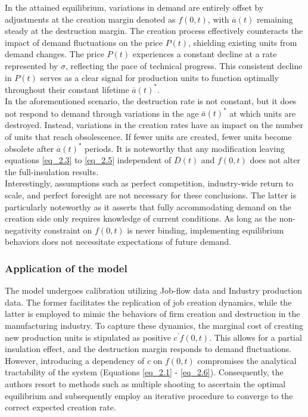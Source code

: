 \documentclass[12pt]{report}
\begin{document}
In the attained equilibrium, variations in demand are entirely offset by adjustments at the creation margin denoted as
\(f(0, t)\), with \(\overline{a}(t)\) remaining steady at the destruction margin. The creation process effectively
counteracts the impact of demand fluctuations on the price \(P(t)\), shielding existing units from demand
changes. The price \(P(t)\) experiences a constant decline at a rate represented by \(\sigma\), reflecting the pace of
technical progress. This consistent decline in \(P(t)\) serves as a clear signal for production units to function
optimally throughout their constant lifetime \(\overline{a}(t)^*\). \\
In the aforementioned scenario, the destruction rate is not constant, but it does not respond to demand through
variations in the age \(\overline{a}(t)^*\) at which units are destroyed. Instead, variations in the creation rates have
an impact on the number of units that reach obsolescence. If fewer units are created, fewer units become obsolete after
\(\overline{a}(t)^*\) periods. It is noteworthy that any modification leaving equations \ref{eq_2.3} to \ref{eq_2.5}
independent of \(\overline{D}(t)\) and \(f(0,t)\) does not alter the full-insulation results. 
\\
Interestingly, assumptions such as perfect competition, industry-wide return to scale, and perfect foresight are not
necessary for these conclusions. The latter is particularly noteworthy as it asserts that fully accommodating demand on
the creation side only requires knowledge of current conditions. As long as the non-negativity constraint on \(f(0,t)\)
is never binding, implementing equilibrium behaviors does not necessitate expectations of future demand. 
\subsubsection{Application of the model}
The model undergoes calibration utilizing Job-flow data and Industry production data. The former facilitates the
replication of job creation dynamics, while the latter is employed to mimic the behaviors of firm creation and
destruction in the manufacturing industry. To capture these dynamics, the marginal cost of creating new production units
is stipulated as positive \(c^{\prime}f(0,t)\). This allows for a partial insulation effect, and the destruction margin responds
to demand fluctuations. However, introducing a dependency of \(c\) on \(f(0,t)\) compromises the analytical tractability
of the system (Equations \ref{eq_2.1} - \ref{eq_2.6}). Consequently, the authors resort to methods such as multiple
shooting to ascertain the optimal equilibrium and subsequently employ an iterative procedure to converge to the correct
expected creation rate. 
\end{document}
